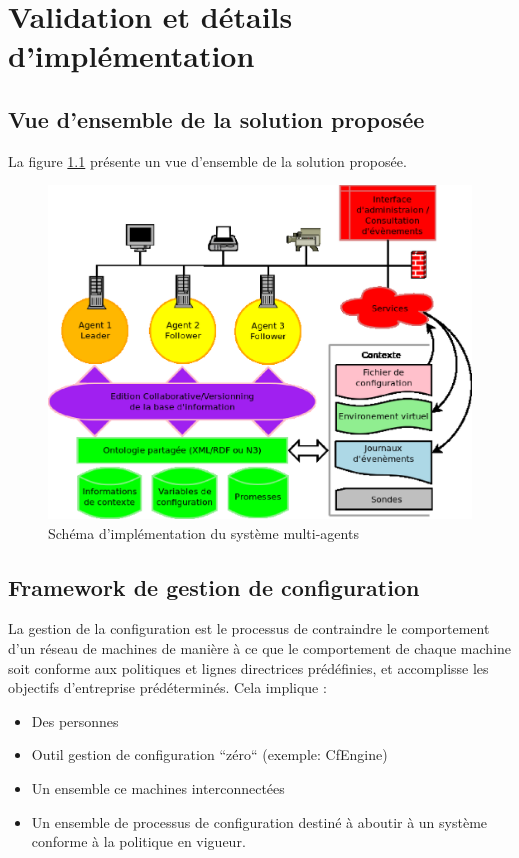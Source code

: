 \chapter{Validation et détails d'implémentation}

\section{Vue d'ensemble de la solution proposée}

La figure \ref{fig:archi} présente un vue d'ensemble de la solution
proposée.

\begin{figure}[H]
    \centering
    \includegraphics[width=.67\textwidth]{img/archi}
    \caption{Schéma d'implémentation du système multi-agents}
    \label{fig:archi}
\end{figure}

\section{Framework de gestion de configuration}

La gestion de la configuration est le processus de contraindre le comportement
d'un réseau de machines de manière à ce que le comportement de chaque machine
soit conforme aux politiques et lignes directrices prédéfinies, et
accomplisse les objectifs d'entreprise prédéterminés. Cela implique :

\begin{itemize}
  \item Des personnes
  \item Outil gestion de configuration ``zéro`` (exemple: CfEngine)
  \item Un ensemble ce machines interconnectées
  \item Un ensemble de processus de configuration destiné à aboutir à un système
	  conforme à la politique en vigueur.
\end{itemize}

